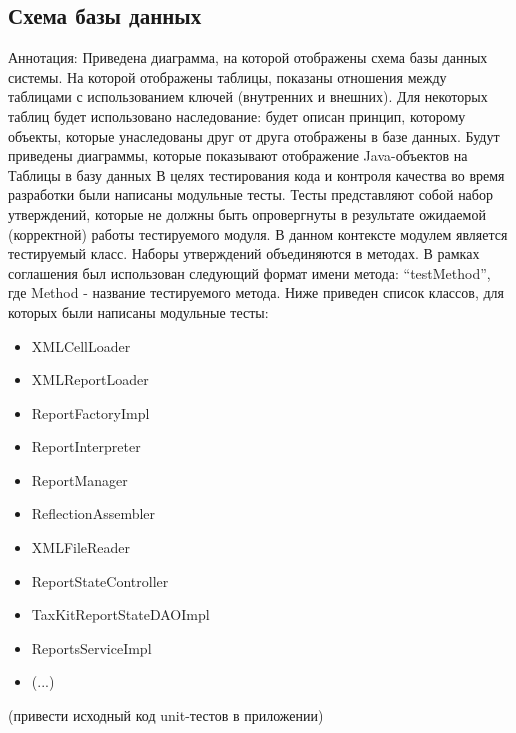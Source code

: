 \documentclass[14pt,a4paper]{reportmod}
\begin{document}
\subsection{Схема базы данных}
Аннотация: Приведена диаграмма, на которой отображены схема базы данных системы. На которой отображены таблицы, показаны отношения между таблицами с использованием ключей (внутренних и внешних). Для некоторых таблиц будет использовано наследование: будет описан принцип, которому объекты, которые унаследованы друг от друга отображены в базе данных. Будут приведены диаграммы, которые показывают отображение Java-объектов на Таблицы в базу данных
В целях тестирования кода и контроля качества во время разработки были написаны модульные тесты. Тесты представляют собой набор утверждений, которые не должны быть опровергнуты в результате ожидаемой (корректной) работы тестируемого модуля. В данном контексте модулем является тестируемый класс. Наборы утверждений объединяются в методах. В рамках соглашения был использован следующий формат имени метода: ``testMethod'', где Method - название тестируемого метода.
Ниже приведен список классов, для которых были написаны модульные тесты:
\begin{itemize}
  \item XMLCellLoader
  \item XMLReportLoader
  \item ReportFactoryImpl
  \item ReportInterpreter
  \item ReportManager
  \item ReflectionAssembler
  \item XMLFileReader
  \item ReportStateController
  \item TaxKitReportStateDAOImpl
  \item ReportsServiceImpl
  \item (...)
\end{itemize}

(привести исходный код unit-тестов в приложении)
\end{document}
